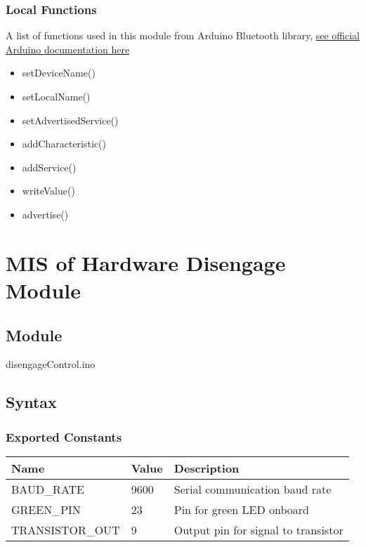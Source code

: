 \documentclass[12pt, titlepage]{article}
\begin{document}
\subsubsection{Local Functions}

A list of functions used in this module from Arduino Bluetooth library, \href{https://www.arduino.cc/reference/en/libraries/arduinoble/}{see official Arduino documentation here}
\begin{itemize}
    \item setDeviceName()
    \item setLocalName()
    \item setAdvertisedService()
    \item addCharacteristic()
    \item addService()
    \item writeValue()
    \item advertise()
\end{itemize}





\section{MIS of Hardware Disengage Module} \label{mHD}

\subsection{Module}
disengageControl.ino

\subsection{Syntax}

\subsubsection{Exported Constants}

\begin{center}
\begin{tabular}{p{4cm} p{2cm} p{6cm}}
\hline
\textbf{Name} & \textbf{Value} & \textbf{Description} \\
\hline
BAUD\_RATE & 9600 & Serial communication baud rate \\
GREEN\_PIN & 23 & Pin for green LED onboard \\
TRANSISTOR\_OUT & 9 & Output pin for signal to transistor \\
\hline
\end{tabular}
\end{center}
\end{document}
